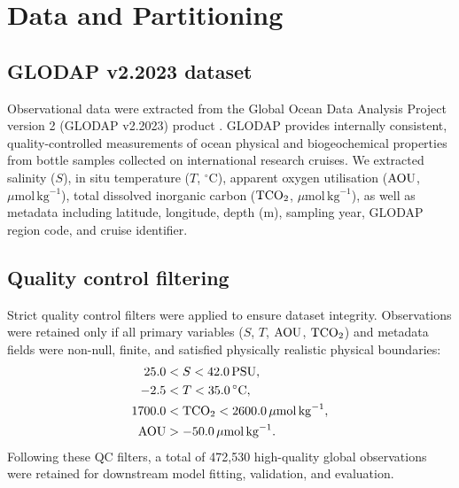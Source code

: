 \section{Data and Partitioning}

\subsection{GLODAP v2.2023 dataset}
Observational data were extracted from the Global Ocean Data Analysis Project version 2 (GLODAP v2.2023) product \citep{Lauvset2023}. GLODAP provides internally consistent, quality-controlled measurements of ocean physical and biogeochemical properties from bottle samples collected on international research cruises. We extracted salinity ($S$), in situ temperature ($T$, $^\circ\mathrm{C}$), apparent oxygen utilisation ($\mathrm{AOU}$, $\mu\mathrm{mol}\,\mathrm{kg}^{-1}$), total dissolved inorganic carbon ($\mathrm{TCO_2}$, $\mu\mathrm{mol}\,\mathrm{kg}^{-1}$), as well as metadata including latitude, longitude, depth (m), sampling year, GLODAP region code, and cruise identifier.

\subsection{Quality control filtering}
Strict quality control filters were applied to ensure dataset integrity. Observations were retained only if all primary variables ($S$, $T$, $\mathrm{AOU}$, $\mathrm{TCO_2}$) and metadata fields were non-null, finite, and satisfied physically realistic physical boundaries:
\begin{align}
25.0 &< S < 42.0\,\mathrm{PSU}, \\
-2.5 &< T < 35.0\,^\circ\mathrm{C}, \\
1700.0 &< \mathrm{TCO_2} < 2600.0\,\mu\mathrm{mol}\,\mathrm{kg}^{-1}, \\
\mathrm{AOU} &> -50.0\,\mu\mathrm{mol}\,\mathrm{kg}^{-1}.
\end{align}
Following these QC filters, a total of 472,530 high-quality global observations were retained for downstream model fitting, validation, and evaluation.

